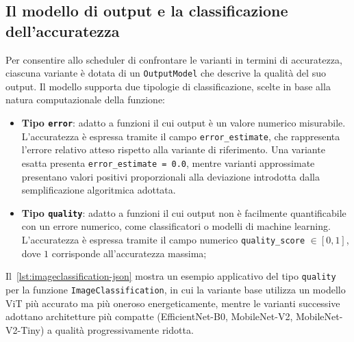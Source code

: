 
\subsection{Il modello di output e la classificazione dell'accuratezza}
\label{sec:output-model}
 
Per consentire allo scheduler di confrontare le varianti in termini di
accuratezza, ciascuna variante è dotata di un \texttt{OutputModel} che
descrive la qualità del suo output. Il modello supporta due tipologie
di classificazione, scelte in base alla natura computazionale della
funzione:
 
\begin{itemize}
    \item \textbf{Tipo \texttt{error}}: adatto a funzioni il cui output
    è un valore numerico misurabile. L'accuratezza è espressa tramite il
    campo \texttt{error\_estimate}, che rappresenta l'errore relativo
    atteso rispetto alla variante di riferimento. Una variante esatta
    presenta \texttt{error\_estimate = 0.0}, mentre varianti
    approssimate presentano valori positivi proporzionali alla
    deviazione introdotta dalla semplificazione algoritmica adottata.
 
    \item \textbf{Tipo \texttt{quality}}: adatto a funzioni il cui
    output non è facilmente quantificabile con un errore numerico, come
    classificatori o modelli di machine learning. L'accuratezza è
    espressa tramite il campo numerico \texttt{quality\_score}
    $\in [0,1]$, dove $1$ corrisponde all'accuratezza massima;
\end{itemize}
 
Il~\autoref{lst:imageclassification-json} mostra un esempio applicativo
del tipo \texttt{quality} per la funzione
\texttt{ImageClassification}, in cui la variante base utilizza un
modello ViT più accurato ma più oneroso energeticamente, mentre le
varianti successive adottano architetture più compatte
(EfficientNet-B0, MobileNet-V2, MobileNet-V2-Tiny) a qualità
progressivamente ridotta.
 
 
